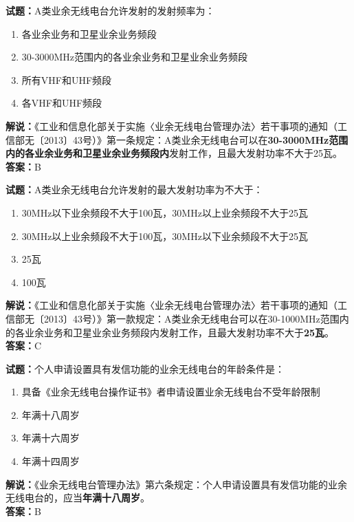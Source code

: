 \documentclass{ctexbook}
\begin{document}
\bigskip


\noindent\textbf{试题：}A类业余无线电台允许发射的发射频率为：
\begin{enumerate}[leftmargin=3em]
	\item 各业余业务和卫星业余业务频段
	\item 30-3000MHz范围内的各业余业务和卫星业余业务频段
	\item 所有VHF和UHF频段
	\item 各VHF和UHF频段
\end{enumerate}
\noindent\textbf{解说：}《工业和信息化部关于实施〈业余无线电台管理办法〉若干事项的通知（工信部无〔2013〕43号）》第一条规定：A类业余无线电台可以在\textbf{30-3000MHz范围内的各业余业务和卫星业余业务频段内}发射工作，且最大发射功率不大于25瓦。\\\noindent\textbf{答案：}B


\bigskip


\noindent\textbf{试题：}A类业余无线电台允许发射的最大发射功率为不大于：
\begin{enumerate}[leftmargin=3em]
	\item 30MHz以下业余频段不大于100瓦，30MHz以上业余频段不大于25瓦
	\item 30MHz以上业余频段不大于100瓦，30MHz以下业余频段不大于25瓦
	\item 25瓦
	\item 100瓦
\end{enumerate}
\noindent\textbf{解说：}《工业和信息化部关于实施〈业余无线电台管理办法〉若干事项的通知（工信部无〔2013〕43号）》第一款规定：A类业余无线电台可以在30-1000MHz范围内的各业余业务和卫星业余业务频段内发射工作，且最大发射功率不大于\textbf{25瓦}。\\\noindent\textbf{答案：}C


\bigskip


\noindent\textbf{试题：}个人申请设置具有发信功能的业余无线电台的年龄条件是：
\begin{enumerate}[leftmargin=3em]
	\item 具备《业余无线电台操作证书》者申请设置业余无线电台不受年龄限制
	\item 年满十八周岁
	\item 年满十六周岁
	\item 年满十四周岁
\end{enumerate}
\noindent\textbf{解说：}《业余无线电台管理办法》第六条规定：个人申请设置具有发信功能的业余无线电台的，应当\textbf{年满十八周岁}。\\\noindent\textbf{答案：}B


\bigskip
\end{document}
